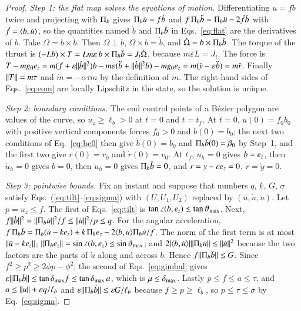 \begin{proof}
\emph{Step 1: the flat map solves the equations of motion.} Differentiating $u=fb$ twice and projecting with $\Pi_b$ gives
$\Pi_b\dot u=f\dot b$ and $f\,\Pi_b\ddot b=\Pi_b\ddot u-2\dot f\dot b$ with $\dot f=\langle b,\dot u\rangle$, so the quantities named $\dot b$
and $\Pi_b\ddot b$ in Eqs.~\eqref{eq:flat} are the derivatives of $b$. Take $\Omega=b\times\dot b$. Then $\Omega\perp b$,
$\Omega\times b=\dot b$, and $\dot\Omega=b\times\Pi_b\ddot b$. The torque of the thrust is $(-Lb)\times T=Lm\varepsilon\,b\times\Pi_b\ddot b
=J_t\dot\Omega$, because $m\varepsilon L=J_t$. The force is $T-mg_0e_z=m(f+\varepsilon\lVert \dot b\rVert^2)b-m\varepsilon(\ddot b+\lVert \dot b\rVert^2b)-mg_0e_z
=m(\ddot y-\varepsilon\ddot b)=m\ddot r$. Finally $\lVert T\rVert=m\tau$ and $\dot m=-\alpha\tau m$ by the definition of $m$. The right-hand
sides of Eqs.~\eqref{eq:eom} are locally Lipschitz in the state, so the solution is unique.

\emph{Step 2: boundary conditions.} The end control points of a B\'ezier polygon are values of the curve, so $u_z\ge\ell_b>0$ at
$t=0$ and $t=t_f$. At $t=0$, $u(0)=f_0b_0$ with positive vertical components forces $f_0>0$ and $b(0)=b_0$; the next two
conditions of Eq.~\eqref{eq:bc0} then give $\dot b(0)=\dot b_0$ and $\Pi_b\ddot b(0)=\beta_0$ by Step~1, and the first two give
$r(0)=r_0$ and $\dot r(0)=v_0$. At $t_f$, $u_h=0$ gives $b=e_z$, then $\dot u_h=0$ gives $\dot b=0$, then $\ddot u_h=0$ gives
$\Pi_b\ddot b=0$, and $r=y-\varepsilon e_z=0$, $\dot r=\dot y=0$.

\emph{Step 3: pointwise bounds.} Fix an instant and suppose that numbers $q$, $k$, $G$, $\sigma$ satisfy
Eqs.~(\ref{eq:tilt}--\ref{eq:sigma}) with $(U,U_1,U_2)$ replaced by $(u,\dot u,\ddot u)$. Let $p=u_z\le f$. The first of
Eqs.~\eqref{eq:tilt} is $\tan\angle(b,e_z)\le\tan\vartheta_{\max}$. Next, $f\lVert \dot b\rVert^2=\lVert \Pi_b\dot u\rVert^2/f\le\lVert \dot u\rVert^2/p\le q$.
For the angular acceleration, $f\,\Pi_b\ddot b=\Pi_b(\ddot u-ke_z)+k\,\Pi_be_z-2\langle b,\dot u\rangle\Pi_b\dot u/f$. The norm of the first term is at
most $\lVert \ddot u-ke_z\rVert$; $\lVert \Pi_be_z\rVert=\sin\angle(b,e_z)\le\sin\vartheta_{\max}$; and
$2|\langle b,\dot u\rangle|\lVert \Pi_b\dot u\rVert\le\lVert \dot u\rVert^2$ because the two factors are the parts of $\dot u$ along and across $b$. Hence
$f\lVert \Pi_b\ddot b\rVert\le G$. Since $f^2\ge p^2\ge2\phi p-\phi^2$, the second of Eqs.~\eqref{eq:gimbal} gives
$\varepsilon\lVert \Pi_b\ddot b\rVert\le\tan\delta_{\max} f\le\tan\delta_{\max}\,a$, which is $\mu\le\delta_{\max}$. Lastly $p\le f\le a\le\tau$, and
$a\le\lVert u\rVert+\varepsilon q/\ell_b$ and $\varepsilon\lVert \Pi_b\ddot b\rVert\le\varepsilon G/\ell_b$ because $f\ge p\ge\ell_b$, so
$p\le\tau\le\sigma$ by Eq.~\eqref{eq:sigma}.


\end{proof}
